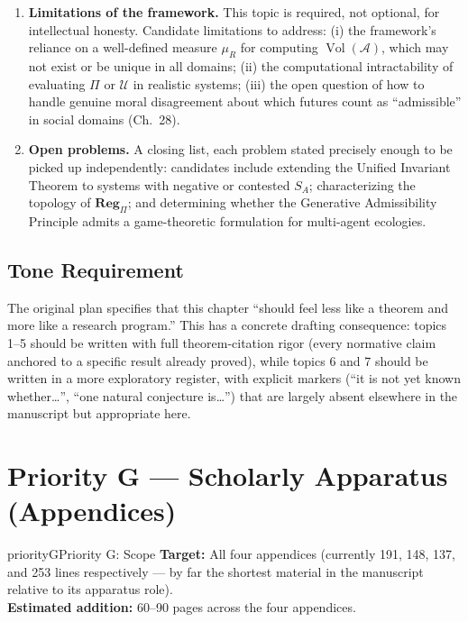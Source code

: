 \documentclass[11pt]{report}
\newcommand{\adm}{\mathcal{A}}
\newcommand{\Vol}{\operatorname{Vol}}
\begin{document}
\begin{enumerate}
  requires a specified utility function; admissibility
  preservation is defined without reference to any
  particular agent's preferences, only to the structure of
  future possibility itself. This topic should state precisely
  what is gained and lost by this generality.
\item \textbf{Limitations of the framework.} This topic is
  required, not optional, for intellectual honesty. Candidate
  limitations to address: (i) the framework's reliance on a
  well-defined measure $\mu_R$ for computing $\Vol(\adm)$,
  which may not exist or be unique in all domains; (ii) the
  computational intractability of evaluating $\Pi$ or
  $\mathcal{U}$ in realistic systems; (iii) the open question
  of how to handle genuine moral disagreement about which
  futures count as ``admissible'' in social domains (Ch.~28).
\item \textbf{Open problems.} A closing list, each problem
  stated precisely enough to be picked up independently:
  candidates include extending the Unified Invariant Theorem to
  systems with negative or contested $S_A$; characterizing the
  topology of $\mathbf{Reg}_\Pi$; and determining whether the
  Generative Admissibility Principle admits a
  game-theoretic formulation for multi-agent ecologies.
\end{enumerate}

\section{Tone Requirement}

The original plan specifies that this chapter ``should feel
less like a theorem and more like a research program.'' This
has a concrete drafting consequence: topics 1--5 should be
written with full theorem-citation rigor (every normative claim
anchored to a specific result already proved), while topics 6
and 7 should be written in a more exploratory register, with
explicit markers (``it is not yet known whether\ldots'',
``one natural conjecture is\ldots'') that are largely absent
elsewhere in the manuscript but appropriate here.

\chapter{Priority G --- Scholarly Apparatus (Appendices)}
\label{ch:priority-g}

\begin{prioritybox}{priorityG}{Priority G: Scope}
\textbf{Target:} All four appendices (currently 191, 148, 137,
  and 253 lines respectively --- by far the shortest material
  in the manuscript relative to its apparatus role).\\
\textbf{Estimated addition:} 60--90 pages across the four
  appendices.
\end{prioritybox}
\end{document}
